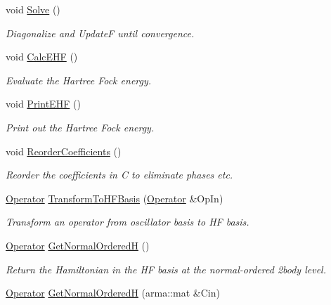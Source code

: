 \begin{DoxyCompactItemize}
void \hyperlink{classHartreeFock_a0666507747c17845ab4f74b97414703c}{Solve} ()
\begin{DoxyCompactList}\small\item\em Diagonalize and UpdateF until convergence. \end{DoxyCompactList}\item 
void \hyperlink{classHartreeFock_aef506c5c5bc0f317ceb9c71bdc44d62b}{Calc\+E\+HF} ()
\begin{DoxyCompactList}\small\item\em Evaluate the Hartree Fock energy. \end{DoxyCompactList}\item 
void \hyperlink{classHartreeFock_a2c3bdda2ea86f9a3b18d203c9aecc353}{Print\+E\+HF} ()
\begin{DoxyCompactList}\small\item\em Print out the Hartree Fock energy. \end{DoxyCompactList}\item 
void \hyperlink{classHartreeFock_a2eb6754f57250a03a2e1bd3e2aef4daf}{Reorder\+Coefficients} ()
\begin{DoxyCompactList}\small\item\em Reorder the coefficients in C to eliminate phases etc. \end{DoxyCompactList}\item 
\hyperlink{classOperator}{Operator} \hyperlink{classHartreeFock_a55914915cea16669e549025c244b62d0}{Transform\+To\+H\+F\+Basis} (\hyperlink{classOperator}{Operator} \&Op\+In)
\begin{DoxyCompactList}\small\item\em Transform an operator from oscillator basis to HF basis. \end{DoxyCompactList}\item 
\hyperlink{classOperator}{Operator} \hyperlink{classHartreeFock_a17bdb52033e2f62bba72ea86bc196b37}{Get\+Normal\+OrderedH} ()
\begin{DoxyCompactList}\small\item\em Return the Hamiltonian in the HF basis at the normal-\/ordered 2body level. \end{DoxyCompactList}\item 
\hyperlink{classOperator}{Operator} \hyperlink{classHartreeFock_ad7da4e35f14128c1c0becf204e15a4e1}{Get\+Normal\+OrderedH} (arma\+::mat \&Cin)\hypertarget{classHartreeFock_ad7da4e35f14128c1c0becf204e15a4e1}{}\label{classHartreeFock_ad7da4e35f14128c1c0becf204e15a4e1}


\end{DoxyCompactItemize}
